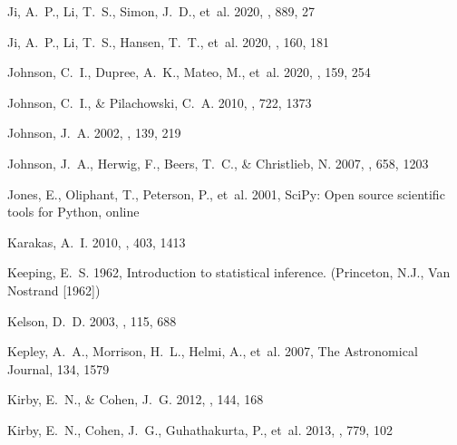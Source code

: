 \documentclass[twocolumn]{aastex63}
\begin{document}
\begin{thebibliography}{}
{Ji}, A.~P., {Li}, T.~S., {Simon}, J.~D., {et~al.} 2020{}, \apj,
  889, 27

{Ji}, A.~P., {Li}, T.~S., {Hansen}, T.~T., {et~al.} 2020{}, \aj,
  160, 181

{Johnson}, C.~I., {Dupree}, A.~K., {Mateo}, M., {et~al.} 2020, \aj, 159, 254

{Johnson}, C.~I., \& {Pilachowski}, C.~A. 2010, \apj, 722, 1373

{Johnson}, J.~A. 2002, \apjs, 139, 219

{Johnson}, J.~A., {Herwig}, F., {Beers}, T.~C., \& {Christlieb}, N. 2007, \apj,
  658, 1203

Jones, E., Oliphant, T., Peterson, P., {et~al.} 2001, {SciPy}: Open source
  scientific tools for {Python},  online

{Karakas}, A.~I. 2010, \mnras, 403, 1413

Keeping, E.~S. 1962, Introduction to statistical inference. (Princeton, N.J.,
  Van Nostrand [1962])

{Kelson}, D.~D. 2003, \pasp, 115, 688

Kepley, A.~A., Morrison, H.~L., Helmi, A., {et~al.} 2007, The Astronomical
  Journal, 134, 1579

{Kirby}, E.~N., \& {Cohen}, J.~G. 2012, \aj, 144, 168

{Kirby}, E.~N., {Cohen}, J.~G., {Guhathakurta}, P., {et~al.} 2013, \apj, 779,
  102


\end{thebibliography}
\end{document}
